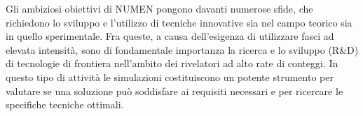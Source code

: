 Gli ambiziosi obiettivi di NUMEN pongono davanti numerose sfide, che richiedono lo sviluppo e l'utilizzo di tecniche innovative sia nel campo teorico sia in quello sperimentale. 
Fra queste, a causa dell'esigenza di utilizzare fasci ad elevata intensità, sono di fondamentale importanza la ricerca e lo sviluppo (R\&D) di tecnologie di frontiera nell'ambito dei rivelatori ad alto rate di conteggi.
In questo tipo di attività le simulazioni costituiscono un potente strumento per valutare se una soluzione può soddisfare ai requisiti necessari e per ricercare le specifiche tecniche ottimali.


